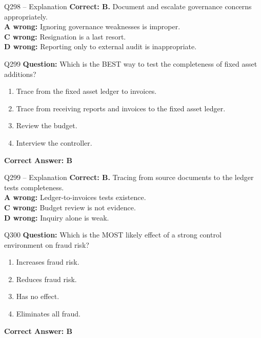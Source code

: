 \documentclass[aspectratio=169,10pt]{beamer}
\begin{document}
	\begin{frame}[t]{Q298 -- Explanation}
		\small
		\textbf{Correct: B.} Document and escalate governance concerns appropriately. \\[4pt]
		\textbf{A wrong:} Ignoring governance weaknesses is improper. \\[2pt]
		\textbf{C wrong:} Resignation is a last resort. \\[2pt]
		\textbf{D wrong:} Reporting only to external audit is inappropriate.
	\end{frame}
	
	\begin{frame}[t]{Q299}
		\small
		\textbf{Question:} Which is the BEST way to test the completeness of fixed asset additions?
		\begin{enumerate}[label=\Alph*.,itemsep=1pt,topsep=2pt]
			\item Trace from the fixed asset ledger to invoices.
			\item Trace from receiving reports and invoices to the fixed asset ledger.
			\item Review the budget.
			\item Interview the controller.
		\end{enumerate}
		\vspace{4pt}
		\textbf{Correct Answer: B}
	\end{frame}
	
	\begin{frame}[t]{Q299 -- Explanation}
		\small
		\textbf{Correct: B.} Tracing from source documents to the ledger tests completeness. \\[4pt]
		\textbf{A wrong:} Ledger-to-invoices tests existence. \\[2pt]
		\textbf{C wrong:} Budget review is not evidence. \\[2pt]
		\textbf{D wrong:} Inquiry alone is weak.
	\end{frame}
	
	\begin{frame}[t]{Q300}
		\small
		\textbf{Question:} Which is the MOST likely effect of a strong control environment on fraud risk?
		\begin{enumerate}[label=\Alph*.,itemsep=1pt,topsep=2pt]
			\item Increases fraud risk.
			\item Reduces fraud risk.
			\item Has no effect.
			\item Eliminates all fraud.
		\end{enumerate}
		\vspace{4pt}
		\textbf{Correct Answer: B}
	\end{frame}
	
\end{document}
